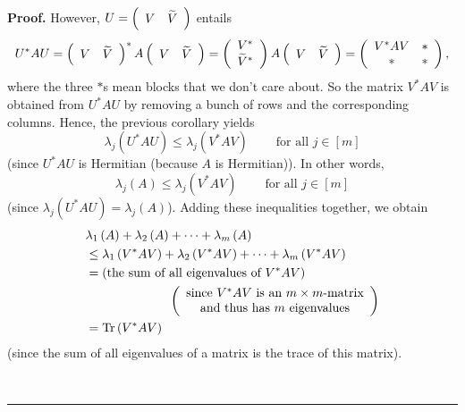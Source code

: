 \documentclass[numbers=enddot,12pt,final,onecolumn,notitlepage]{scrartcl}%
\numberwithin{exer}{subsection}
\theoremstyle{definition}
\newenvironment{proof}[1][Proof]{\noindent\textbf{#1.} }{\ \rule{0.5em}{0.5em}}
\begin{document}
\begin{proof}
However, $U=\left(
\begin{array}
[c]{cc}%
V & \widetilde{V}%
\end{array}
\right)  $ entails%
\[
U^{\ast}AU=\left(
\begin{array}
[c]{cc}%
V & \widetilde{V}%
\end{array}
\right)  ^{\ast}A\left(
\begin{array}
[c]{cc}%
V & \widetilde{V}%
\end{array}
\right)  =\left(
\begin{array}
[c]{c}%
V^{\ast}\\
\widetilde{V}^{\ast}%
\end{array}
\right)  A\left(
\begin{array}
[c]{cc}%
V & \widetilde{V}%
\end{array}
\right)  =\left(
\begin{array}
[c]{cc}%
V^{\ast}AV & \ast\\
\ast & \ast
\end{array}
\right)  ,
\]
where the three $\ast$s mean blocks that we don't care about. So the matrix
$V^{\ast}AV$ is obtained from $U^{\ast}AU$ by removing a bunch of rows and the
corresponding columns. Hence, the previous corollary yields%
\[
\lambda_{j}\left(  U^{\ast}AU\right)  \leq\lambda_{j}\left(  V^{\ast
}AV\right)  \ \ \ \ \ \ \ \ \ \ \text{for all }j\in\left[  m\right]
\]
(since $U^{\ast}AU$ is Hermitian (because $A$ is Hermitian)). In other words,%
\[
\lambda_{j}\left(  A\right)  \leq\lambda_{j}\left(  V^{\ast}AV\right)
\ \ \ \ \ \ \ \ \ \ \text{for all }j\in\left[  m\right]
\]
(since $\lambda_{j}\left(  U^{\ast}AU\right)  =\lambda_{j}\left(  A\right)
$). Adding these inequalities together, we obtain%
\begin{align*}
&  \lambda_{1}\left(  A\right)  +\lambda_{2}\left(  A\right)  +\cdots
+\lambda_{m}\left(  A\right) \\
&  \leq\lambda_{1}\left(  V^{\ast}AV\right)  +\lambda_{2}\left(  V^{\ast
}AV\right)  +\cdots+\lambda_{m}\left(  V^{\ast}AV\right) \\
&  =\left(  \text{the sum of all eigenvalues of }V^{\ast}AV\right) \\
&  \ \ \ \ \ \ \ \ \ \ \ \ \ \ \ \ \ \ \ \ \left(
\begin{array}
[c]{c}%
\text{since }V^{\ast}AV\text{ is an }m\times m\text{-matrix}\\
\text{and thus has }m\text{ eigenvalues}%
\end{array}
\right) \\
&  =\operatorname*{Tr}\left(  V^{\ast}AV\right)
\end{align*}
(since the sum of all eigenvalues of a matrix is the trace of this matrix).


\end{proof}
\end{document}
